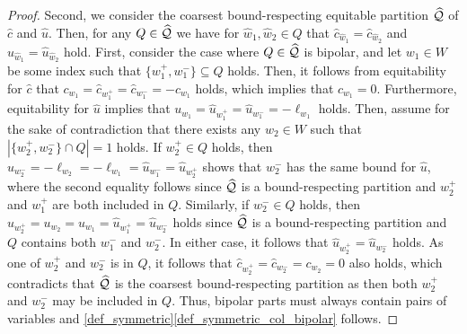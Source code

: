 \documentclass[pdflatex,sn-mathphys-num]{sn-jnl}%
\theoremstyle{thmstyleone}%
\theoremstyle{thmstylethree}%
\theoremstyle{thmstyletwo}%
\begin{document}
\begin{proof}
Second, we consider the coarsest bound-respecting equitable partition $\widehat{\mathcal{Q}}$ of $\widehat{c}$ and $\widehat{u}$. Then, for any $Q\in \widehat{\mathcal{Q}}$ we have for $\widehat{w}_1, \widehat{w}_2 \in Q$ that $\widehat{c}_{\widehat{w}_1} = \widehat{c}_{\widehat{w}_2}$ and $\widehat{u}_{\widehat{w}_1} = \widehat{u}_{\widehat{w}_2}$ hold.
First, consider the case where $Q\in \widehat{\mathcal{Q}}$ is bipolar, and let $w_1\in W$ be some index such that $\{w_1^+,w_1^-\}\subseteq Q$ holds. Then, it follows from equitability for $\widehat{c}$ that $c_{w_1} = \widehat{c}_{w_1^+} = \widehat{c}_{w_1^-} = -c_{w_1}$ holds, which implies that $c_{w_1} = 0$. Furthermore, equitability for $\widehat{u}$ implies that $u_{w_1} = \widehat{u}_{w_1^+} = \widehat{u}_{w_1^-} = -\ell_{w_1}$ holds. Then, assume for the sake of contradiction that there exists any $w_2\in W$ such that $|\{w_2^+,w_2^-\} \cap Q| = 1$ holds. 
If $w_2^+\in Q$ holds, then $\widehat{u}_{w^-_2} = - \ell_{w_2} = - \ell_{w_1} = \widehat{u}_{w^-_1} =  \widehat{u}_{w^+_2}$ shows that $w_2^-$ has the same bound for $\widehat{u}$, where the second equality follows since $\widehat{\mathcal{Q}}$ is a bound-respecting partition and $w_2^+$ and $w_1^+$ are both included in $Q$. Similarly, if $w_2^- \in Q$ holds, then $\widehat{u}_{w^+_2} = u_{w_2} = u_{w_1} = \widehat{u}_{w^+_1} = \widehat{u}_{w^-_2}$ holds since $\widehat{\mathcal{Q}}$ is a bound-respecting partition and $Q$ contains both $w^-_1$ and $w^-_2$. In either case, it follows that $\widehat{u}_{w_2^+} = \widehat{u}_{w_2^-}$ holds. As one of $w_2^+$ and $w_2^-$ is in $Q$, it follows that $\widehat{c}_{w^+_2} = \widehat{c}_{w^-_2} = c_{w_2} = 0$ also holds, which contradicts that $\widehat{\mathcal{Q}}$ is the coarsest bound-respecting partition as then both $w_2^+$ and $w_2^-$ may be included in $Q$. Thus, bipolar parts must always contain pairs of variables and  \cref{def_symmetric}\ref{def_symmetric_col_bipolar} follows.


\end{proof}
\end{document}
